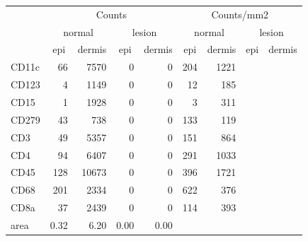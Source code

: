 \begin{tabular}{lrrrr|rrrr}
   \hline
 
         \multicolumn{1}{c}{} & \multicolumn{4}{c|}{Counts} & \multicolumn{4}{c}{Counts/mm2} \\ 
         \multicolumn{1}{c}{} & \multicolumn{2}{c}{normal} & \multicolumn{2}{c|}{lesion} & \multicolumn{2}{c}{normal} & \multicolumn{2}{c}{lesion}  \\ 
         \multicolumn{1}{c}{} & \multicolumn{1}{c}{epi} & dermis & \multicolumn{1}{c}{epi} & \multicolumn{1}{c|}{dermis} & \multicolumn{1}{c}{epi} & dermis & \multicolumn{1}{c}{epi} & dermis  \\ 
         \hline
    CD11c & 66 & 7570 & 0 & 0 & 204 & 1221 &  &  \\ 
  CD123 & 4 & 1149 & 0 & 0 & 12 & 185 &  &  \\ 
  CD15 & 1 & 1928 & 0 & 0 & 3 & 311 &  &  \\ 
  CD279 & 43 & 738 & 0 & 0 & 133 & 119 &  &  \\ 
  CD3 & 49 & 5357 & 0 & 0 & 151 & 864 &  &  \\ 
  CD4 & 94 & 6407 & 0 & 0 & 291 & 1033 &  &  \\ 
  CD45 & 128 & 10673 & 0 & 0 & 396 & 1721 &  &  \\ 
  CD68 & 201 & 2334 & 0 & 0 & 622 & 376 &  &  \\ 
  CD8a & 37 & 2439 & 0 & 0 & 114 & 393 &  &  \\ 
  area & 0.32 & 6.20 & 0.00 & 0.00 &    &    &    &    \\ 
   \hline
\end{tabular}
